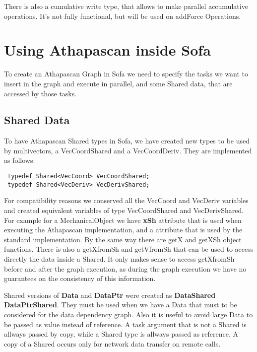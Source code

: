 There is also a cumulative write type, that allows to make parallel accumulative operations. It's not fully functional, but will be used on addForce Operations.

\section{Using Athapascan inside Sofa}
To create an Athapascan Graph in Sofa we need to specify the tasks we want to insert in the graph and execute in  parallel, and some Shared data, that are accessed by those tasks. 
\subsection{Shared Data}
To have Athapascan Shared types in Sofa, we have created new types to be used by multivectors, a VecCoordShared and a VecCoordDeriv. They are implemented as follows:

\begin{verbatim}
 typedef Shared<VecCoord> VecCoordShared;
 typedef Shared<VecDeriv> VecDerivShared;
\end{verbatim}

For compatibility reasons we conserved all the VecCoord and VecDeriv variables and created equivalent variables of type VecCoordShared and VecDerivShared. For example for a MechanicalObject we have \textbf{xSh} attribute that is used when executing the Athapascan implementation, and a  attribute that is used by the standard implementation. By the same way there are getX and getXSh object functions. There is also a getXfromSh and getVfromSh that can be used to access directly the data inside a Shared.  It only makes sense to access getXfromSh before and after the graph execution, as during the graph execution we have no guarantees on the consistency of this information.	

Shared versions of \textbf{Data} and \textbf{DataPtr} were created as \textbf{DataShared} \textbf{DataPtrShared}. They must be used when we have a Data that must  to be considered for the  data dependency  graph. Also it is useful to avoid large Data to be passed as value instead of reference. A task argument that is not a Shared is allways passed by copy, while a Shared type is allways passed as reference. A copy  of a Shared occurs only for network data transfer on remote calls.